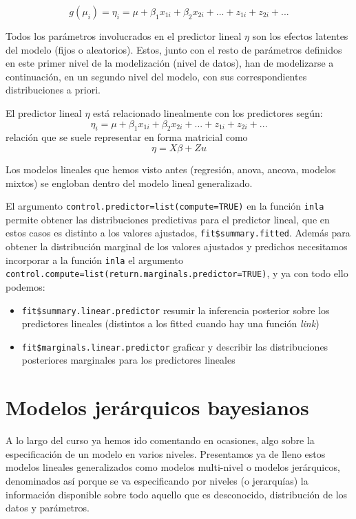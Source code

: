 \documentclass[
]{book}
\providecommand{\tightlist}{%
  \setlength{\itemsep}{0pt}\setlength{\parskip}{0pt}}
\begin{document}
\[g(\mu_i)=\eta_i=\mu + \beta_1 x_{1i} +   \beta_2 x_{2i} +...+ z_{1i} + z_{2i}+...\]

Todos los parámetros involucrados en el predictor lineal \(\eta\) son los efectos latentes del modelo (fijos o aleatorios). Estos, junto con el resto de parámetros definidos en este primer nivel de la modelización (nivel de datos), han de modelizarse a continuación, en un segundo nivel del modelo, con sus correspondientes distribuciones a priori.

El predictor lineal \(\eta\) está relacionado linealmente con los predictores según:
\[\eta_i=\mu + \beta_1 x_{1i} +   \beta_2 x_{2i} +...+ z_{1i} + z_{2i}+...\]
relación que se suele representar en forma matricial como
\[\eta=X\beta + Z u\]

Los modelos lineales que hemos visto antes (regresión, anova, ancova, modelos mixtos) se engloban dentro del modelo lineal generalizado.

El argumento \texttt{control.predictor=list(compute=TRUE)} en la función \texttt{inla} permite obtener las distribuciones predictivas para el predictor lineal, que en estos casos es distinto a los valores ajustados, \texttt{fit\$summary.fitted}. Además para obtener la distribución marginal de los valores ajustados y predichos necesitamos incorporar a la función \texttt{inla} el argumento \texttt{control.compute=list(return.marginals.predictor=TRUE)}, y ya con todo ello podemos:

\begin{itemize}
\tightlist
\item
  \texttt{fit\$summary.linear.predictor} resumir la inferencia posterior sobre los
  predictores lineales (distintos a los fitted cuando hay una función \emph{link})
\item
  \texttt{fit\$marginals.linear.predictor} graficar y describir las distribuciones posteriores marginales para los predictores lineales
\end{itemize}

\hypertarget{modelos-jeruxe1rquicos-bayesianos}{%
\section{Modelos jerárquicos bayesianos}\label{modelos-jeruxe1rquicos-bayesianos}}

A lo largo del curso ya hemos ido comentando en ocasiones, algo sobre la especificación de un modelo en varios niveles. Presentamos ya de lleno estos modelos lineales generalizados como modelos multi-nivel o modelos jerárquicos, denominados así porque se va especificando por niveles (o jerarquías) la información disponible sobre todo aquello que es desconocido, distribución de los datos y parámetros.
\end{document}
